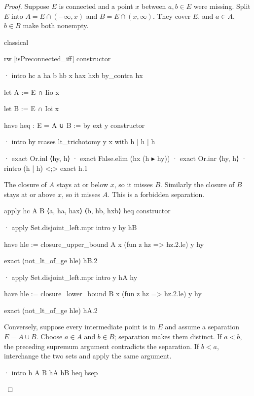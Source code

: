 \begin{proof}
  Suppose $E$ is connected and a point $x$ between $a,b\in E$ were missing.
  Split $E$ into $A=E\cap(-\infty,x)$ and $B=E\cap(x,\infty)$.
  They cover $E$, and $a\in A$, $b\in B$ make both nonempty.

  \begin{lean}
    classical

    rw [isPreconnected_iff]
    constructor

    · intro hc a ha b hb x hax hxb
      by_contra hx

      let A := E ∩ Iio x

      let B := E ∩ Ioi x

      have heq : E = A ∪ B := by
        ext y
        constructor

        · intro hy
          rcases lt_trichotomy y x with h | h | h

          · exact Or.inl ⟨hy, h⟩
          · exact False.elim (hx (h ▸ hy))
          · exact Or.inr ⟨hy, h⟩
        · rintro (h | h) <;> exact h.1
  \end{lean}

  The closure of $A$ stays at or below $x$, so it misses $B$.
  Similarly the closure of $B$ stays at or above $x$, so it misses $A$.
  This is a forbidden separation.

  \begin{lean}
    apply hc A B ⟨a, ha, hax⟩ ⟨b, hb, hxb⟩ heq
    constructor

    · apply Set.disjoint_left.mpr
      intro y hy hB

      have hle := closure_upper_bound A x (fun z hz => hz.2.le) y hy

      exact (not_lt_of_ge hle) hB.2

    · apply Set.disjoint_left.mpr
      intro y hA hy

      have hle := closure_lower_bound B x (fun z hz => hz.2.le) y hy

      exact (not_lt_of_ge hle) hA.2
  \end{lean}

  Conversely, suppose every intermediate point is in $E$ and assume a separation $E=A\cup B$.
  Choose $a\in A$ and $b\in B$; separation makes them distinct.
  If $a<b$, the preceding supremum argument contradicts the separation.
  If $b<a$, interchange the two sets and apply the same argument.

  \begin{lean}
    · intro h A B hA hB heq hsep


\end{lean}
\end{proof}
